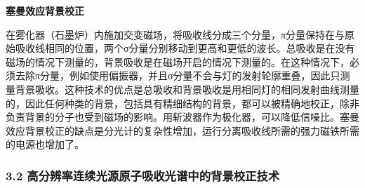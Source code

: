 \textbf{塞曼效应背景校正}

在雾化器（石墨炉）内施加交变磁场，将吸收线分成三个分量，π分量保持在与原始吸收线相同的位置，两个σ分量分别移动到更高和更低的波长。总吸收是在没有磁场的情况下测量的，背景吸收是在磁场开启的情况下测量的。在这种情况下，必须去除π分量，例如使用偏振器，并且σ分量不会与灯的发射轮廓重叠，因此只测量背景吸收。这种技术的优点是总吸收和背景吸收是用相同灯的相同发射曲线测量的，因此任何种类的背景，包括具有精细结构的背景，都可以被精确地校正，除非负责背景的分子也受到磁场的影响。用斩波器作为极化器，可以降低信噪比。塞曼效应背景校正的缺点是分光计的复杂性增加，运行分离吸收线所需的强力磁铁所需的电源也增加了。

\subsubsection{3.2 高分辨率连续光源原子吸收光谱中的背景校正技术}
